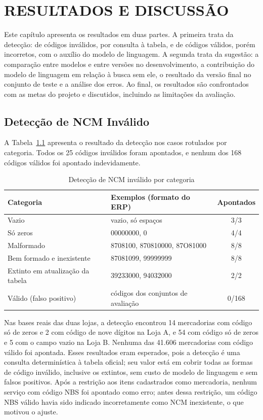 \chapter{RESULTADOS E DISCUSSÃO}
\label{cap:resultados}

Este capítulo apresenta os resultados em duas partes. A primeira trata da detecção: de códigos inválidos, por consulta à tabela, e de códigos válidos, porém incorretos, com o auxílio do modelo de linguagem. A segunda trata da sugestão: a comparação entre modelos e entre versões no desenvolvimento, a contribuição do modelo de linguagem em relação à busca sem ele, o resultado da versão final no conjunto de teste e a análise dos erros. Ao final, os resultados são confrontados com as metas do projeto e discutidos, incluindo as limitações da avaliação.

\section{Detecção de NCM Inválido}

A Tabela~\ref{tab:invalidos} apresenta o resultado da detecção nos casos rotulados por categoria. Todos os 25 códigos inválidos foram apontados, e nenhum dos 168 códigos válidos foi apontado indevidamente.

\begin{table}[H]
\centering
\caption{Detecção de NCM inválido por categoria}
\label{tab:invalidos}
\begin{tabular}{p{5.2cm} p{5.4cm} c}
\hline
\textbf{Categoria} & \textbf{Exemplos (formato do ERP)} & \textbf{Apontados} \\
\hline
Vazio & vazio, só espaços & 3/3 \\
Só zeros & 00000000, 0 & 4/4 \\
Malformado & 8708100, 870810000, 87O81000 & 8/8 \\
Bem formado e inexistente & 87081099, 99999999 & 8/8 \\
Extinto em atualização da tabela & 39233000, 94032000 & 2/2 \\
\hline
Válido (falso positivo) & códigos dos conjuntos de avaliação & 0/168 \\
\hline
\end{tabular}
\end{table}

Nas bases reais das duas lojas, a detecção encontrou 14 mercadorias com código só de zeros e 2 com código de nove dígitos na Loja A, e 54 com código só de zeros e 5 com o campo vazio na Loja B. Nenhuma das 41.606 mercadorias com código válido foi apontada. Esses resultados eram esperados, pois a detecção é uma consulta determinística à tabela oficial; seu valor está em cobrir todas as formas de código inválido, inclusive os extintos, sem custo de modelo de linguagem e sem falsos positivos. Após a restrição aos itens cadastrados como mercadoria, nenhum serviço com código NBS foi apontado como erro; antes dessa restrição, um código NBS válido havia sido indicado incorretamente como NCM inexistente, o que motivou o ajuste.

